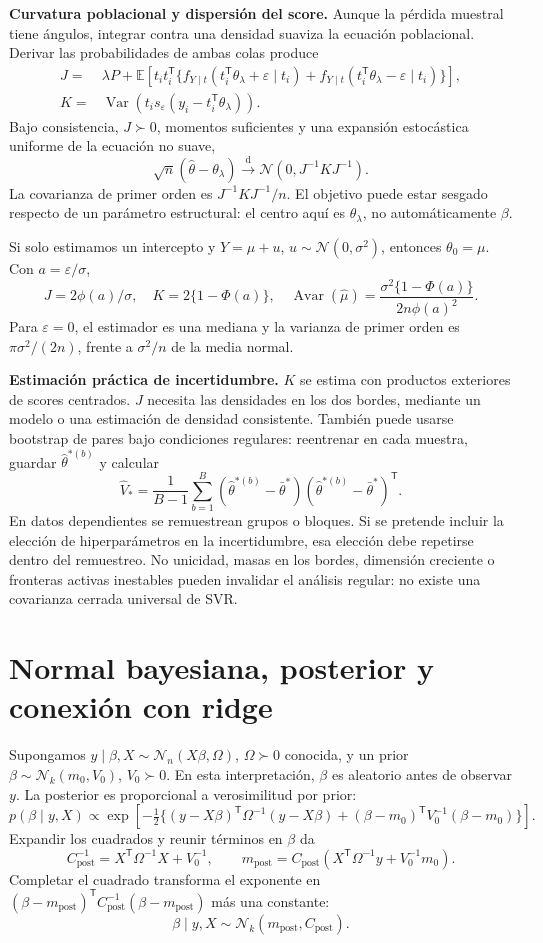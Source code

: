 \documentclass[11pt,a4paper]{article}
\newcommand{\E}{\mathbb E}
\newcommand{\T}{^{\mathsf T}}
\DeclareMathOperator{\Var}{Var}
\newcommand{\dto}{\xrightarrow{\mathrm d}}
\newcommand{\Normal}{\mathcal N}
\newcommand{\topic}[2]{\clearpage\section{#1}\label{#2}}
\theoremstyle{definition}\newtheorem{definicion}[teorema]{Definición}
\begin{document}
\textbf{Curvatura poblacional y dispersión del score.}
Aunque la pérdida muestral tiene ángulos, integrar contra una densidad
suaviza la ecuación poblacional.
Derivar las probabilidades de ambas colas produce
\[
\begin{aligned}
J={}&\lambda P+
\E\!\left[t_it_i\T
\{f_{Y\mid t}(t_i\T\theta_\lambda+\varepsilon\mid t_i)
+f_{Y\mid t}(t_i\T\theta_\lambda-\varepsilon\mid t_i)\}\right],\\
K={}&\Var\!\left(t_i s_\varepsilon(y_i-t_i\T\theta_\lambda)\right).
\end{aligned}
\]
Bajo consistencia, $J\succ0$, momentos suficientes y una expansión
estocástica uniforme de la ecuación no suave,
\[
\boxed{\sqrt n(\widehat\theta-\theta_\lambda)
\dto\Normal(0,J^{-1}KJ^{-1})}.
\]
La covarianza de primer orden es $J^{-1}KJ^{-1}/n$.
El objetivo puede estar sesgado respecto de un parámetro estructural:
el centro aquí es $\theta_\lambda$, no automáticamente $\beta$.

\begin{ejemplo}
Si solo estimamos un intercepto y $Y=\mu+u$,
$u\sim\Normal(0,\sigma^2)$, entonces $\theta_0=\mu$.
Con $a=\varepsilon/\sigma$,
\[
J=2\phi(a)/\sigma,\quad K=2\{1-\Phi(a)\},\quad
\operatorname{Avar}(\widehat\mu)
=\frac{\sigma^2\{1-\Phi(a)\}}{2n\phi(a)^2}.
\]
Para $\varepsilon=0$, el estimador es una mediana y la varianza de primer
orden es $\pi\sigma^2/(2n)$, frente a $\sigma^2/n$ de la media normal.
\end{ejemplo}
\textbf{Estimación práctica de incertidumbre.}
$K$ se estima con productos exteriores de scores centrados.
$J$ necesita las densidades en los dos bordes, mediante un modelo o
una estimación de densidad consistente.
También puede usarse bootstrap de pares bajo condiciones regulares:
reentrenar en cada muestra, guardar $\widehat\theta^{*(b)}$ y calcular
\[
\widehat V_*=\frac1{B-1}\sum_{b=1}^B
(\widehat\theta^{*(b)}-\bar\theta^*)
(\widehat\theta^{*(b)}-\bar\theta^*)\T.
\]
En datos dependientes se remuestrean grupos o bloques.
Si se pretende incluir la elección de hiperparámetros en la incertidumbre,
esa elección debe repetirse dentro del remuestreo.
No unicidad, masas en los bordes, dimensión creciente o fronteras activas
inestables pueden invalidar el análisis regular: no existe una covarianza
cerrada universal de SVR.

\topic{Normal bayesiana, posterior y conexión con ridge}{s55}
Supongamos $y\mid\beta,X\sim\Normal_n(X\beta,\Omega)$,
$\Omega\succ0$ conocida, y un prior
$\beta\sim\Normal_k(m_0,V_0)$, $V_0\succ0$.
En esta interpretación, $\beta$ es aleatorio antes de observar $y$.
La posterior es proporcional a verosimilitud por prior:
\[
p(\beta\mid y,X)\propto
\exp\!\left[-\tfrac12\{
(y-X\beta)\T\Omega^{-1}(y-X\beta)
+(\beta-m_0)\T V_0^{-1}(\beta-m_0)\}\right].
\]
Expandir los cuadrados y reunir términos en $\beta$ da
\[
C_{\mathrm{post}}^{-1}=X\T\Omega^{-1}X+V_0^{-1},\qquad
m_{\mathrm{post}}=C_{\mathrm{post}}
(X\T\Omega^{-1}y+V_0^{-1}m_0).
\]
Completar el cuadrado transforma el exponente en
$(\beta-m_{\mathrm{post}})\T C_{\mathrm{post}}^{-1}
(\beta-m_{\mathrm{post}})$ más una constante:
\[
\boxed{\beta\mid y,X\sim\Normal_k(m_{\mathrm{post}},C_{\mathrm{post}})}.
\]
\end{document}

